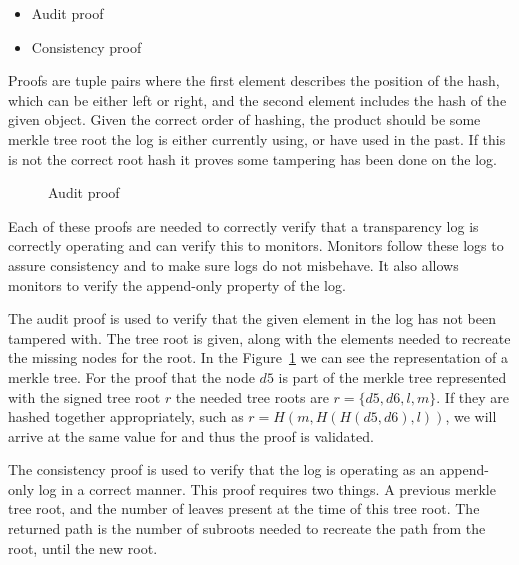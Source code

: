 \documentclass[../Main/thesis.tex]{subfiles}
\begin{document}
\begin{itemize}
\item Audit proof
\item Consistency proof
\end{itemize}

Proofs are tuple pairs where the first element describes the position of the
hash, which can be either left or right, and the second element includes the
hash of the given object. Given the correct order of hashing, the product should
be some merkle tree root the log is either currently using, or have used in the
past. If this is not the correct root hash it proves some tampering has been
done on the log.

\begin{figure}[H]
\centering
{}%
\qquad
{}%
\caption{Audit proof}
\label{fig:audit}
\end{figure}

Each of these proofs are needed to correctly verify that a transparency log
is correctly operating and can verify this to monitors.  Monitors follow
these logs to assure consistency and to make sure logs do not misbehave. It
also allows monitors to verify the append-only property of the log.

The audit proof is used to verify that the given element in the log has not been
tampered with. The tree root is given, along with the elements needed to
recreate the missing nodes for the root. In the Figure~\ref{fig:audit} we can
see the representation of a merkle tree. For the proof that the node $ d5 $ is
part of the merkle tree represented with the signed tree root $ r $ the needed
tree roots are $ r = \{ d5, d6, l, m \} $. If they are hashed together
appropriately, such as $ r = H( m, H( H(d5, d6), l)) $, we will arrive at the
same value for and thus the proof is validated.

The consistency proof is used to verify that the log is operating as an
append-only log in a correct manner. This proof requires two things. A
previous merkle tree root, and the number of leaves present at the time of
this tree root. The returned path is the number of subroots needed to
recreate the path from the root, until the new root.
\end{document}
